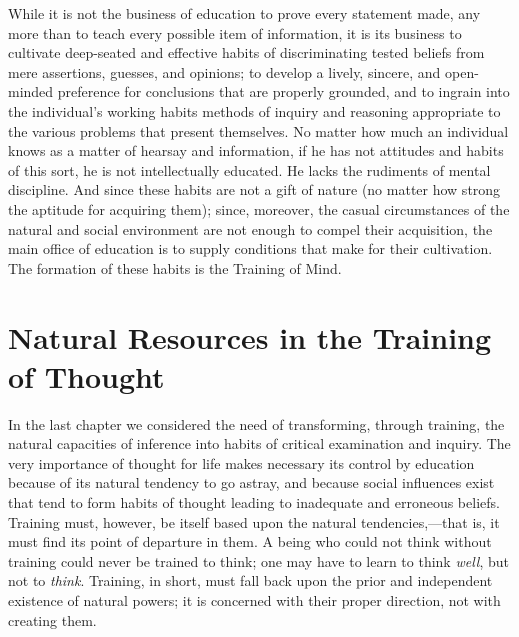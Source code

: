 \documentclass[letterpaper]{book}
\begin{document}


While it is not the business of education to prove every statement made,
any more than to teach every possible item of information, it is its
business to
cultivate
deep-seated and effective habits of discriminating tested beliefs from
mere assertions, guesses, and opinions; to develop a lively, sincere,
and open-minded preference for conclusions that are properly grounded,
and to ingrain into the individual's working habits methods of inquiry
and reasoning appropriate to the various problems that present
themselves. No matter how much an individual knows as a matter of
hearsay and information, if he has not attitudes and habits of this
sort, he is not intellectually educated. He lacks the rudiments of
mental discipline. And since these habits are not a gift of nature (no
matter how strong the aptitude for acquiring them); since, moreover, the
casual circumstances of the natural and social environment are not
enough to compel their acquisition, the main office of education is to
supply conditions that make for their cultivation. The formation of
these habits is the Training of
Mind.

\chapter{Natural Resources in the Training of Thought}


In the last chapter we considered the need of transforming, through
training, the natural capacities of inference into habits of critical
examination and inquiry. The very importance of thought for life makes
necessary its control by education because of its natural tendency to go
astray, and because social influences exist that tend to form habits of
thought leading to inadequate and erroneous beliefs. Training must,
however, be itself based upon the natural tendencies,---that is, it must
find its point of departure in them. A being who could not think without
training could never be trained to think; one may have to learn to think
\emph{well}, but not to \emph{think}. Training, in short, must fall back
upon the prior and independent existence of natural powers; it is
concerned with their proper direction, not with creating them.

\end{document}
